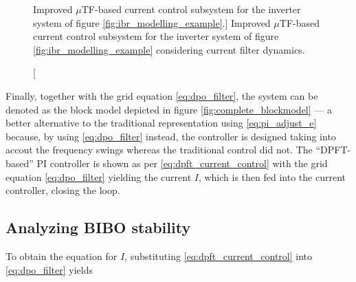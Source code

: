 \begin{figure}[t]
{
}
\caption
[Improved $\mu$TF-based current control subsystem for the inverter system of figure \ref{fig:ibr_modelling_example}.]
{Improved $\mu$TF-based current control subsystem for the inverter system of figure \ref{fig:ibr_modelling_example} considering current filter dynamics.}
\label{fig:partial_blockmodel}
\end{figure}

	Finally, together with the grid equation \eqref{eq:dpo_filter}, the system can be denoted as the block model depicted in figure \ref{fig:complete_blockmodel} — a better alternative to the traditional representation using \eqref{eq:pi_adjust_e} because, by using \eqref{eq:dpo_filter} instead, the controller is designed taking into accout the frequency swings whereas the traditional control did not. The ``DPFT-based'' PI controller is shown as per \eqref{eq:dpft_current_control} with the grid equation \eqref{eq:dpo_filter} yielding the current $I$, which is then fed into the current controller, closing the loop.

\subsection{Analyzing BIBO stability}\label{subsec:analyzing_bibo} %

	To obtain the equation for $I$, substituting \eqref{eq:dpft_current_control} into \eqref{eq:dpo_filter} yields

